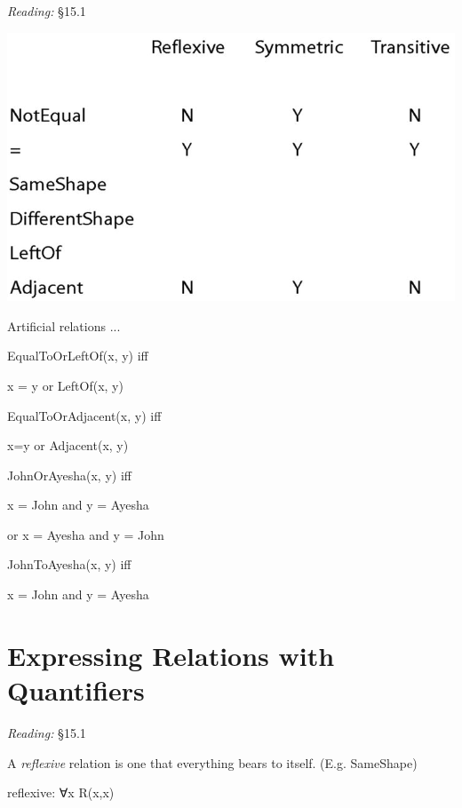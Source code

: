 \documentclass[12pt]{extarticle}
\begin{document}
\begin{multicols*}{3}
\emph{Reading:} §15.1
 
\begin{center}
\includegraphics[scale=0.3]{img/unit_128_fig.png}
\end{center}
Artificial relations ...
 
EqualToOrLeftOf(x, y) iff
 
\hspace{3mm} x = y or LeftOf(x, y)
 
EqualToOrAdjacent(x, y) iff
 
\hspace{3mm} x=y or Adjacent(x, y)
 
JohnOrAyesha(x, y) iff
 
\hspace{3mm} x = John and y = Ayesha
 
\hspace{3mm} or x = Ayesha and y = John
 
JohnToAyesha(x, y) iff
 
\hspace{3mm} x = John and y = Ayesha
 
 
 
\section{Expressing Relations with Quantifiers}
 
\emph{Reading:} §15.1
 
\begin{minipage}{\columnwidth}
 
A \emph{reflexive} relation is one that everything bears to itself. (E.g. SameShape)
 
reflexive: ∀x R(x,x)
 

\end{minipage}
\end{multicols*}
\end{document}
